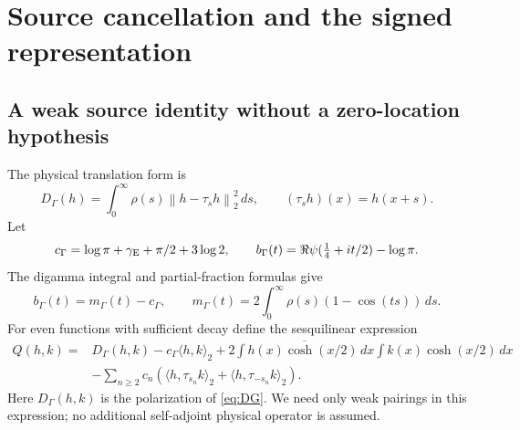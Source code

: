 \documentclass[11pt,a4paper]{article}
\numberwithin{equation}{section}
\theoremstyle{definition}\newtheorem{definition}[theorem]{Definition}
\theoremstyle{remark}\newtheorem{remark}[theorem]{Remark}
\newcommand{\ip}[2]{\langle #1,#2\rangle}
\newcommand{\norm}[1]{\left\|#1\right\|}
\begin{document}
\section{Source cancellation and the signed representation}\label{sec:sourceidentity}
\subsection{A weak source identity without a zero-location hypothesis}
The physical translation form is
\begin{equation}\label{eq:DG}
 D_\Gamma(h)=\int_0^\infty\rho(s)\norm{h-\tau_s h}_2^2\,ds,
 \qquad (\tau_s h)(x)=h(x+s).
\end{equation}
Let
\begin{equation}
 c_\Gamma=\log\pi+\gamma_{\rm E}+\pi/2+3\log2,
 \qquad b_\Gamma(t)=\Re\psi(\tfrac14+it/2)-\log\pi.
\end{equation}
The digamma integral and partial-fraction formulas \cite{nistgamma} give
\begin{equation}\label{eq:gammafourier}
 b_\Gamma(t)=m_\Gamma(t)-c_\Gamma,\qquad
 m_\Gamma(t)=2\int_0^\infty\rho(s)(1-\cos(ts))\,ds.
\end{equation}
For even functions with sufficient decay define the sesquilinear expression
\begin{align}\label{eq:Q}
 Q(h,k)={}&D_\Gamma(h,k)-c_\Gamma\ip hk_2
 +2\overline{\int h(x)\cosh(x/2)\,dx}\int k(x)\cosh(x/2)\,dx\nonumber\\
 &-\sum_{n\ge2}c_n\left(\ip h{\tau_{s_n}k}_2+\ip h{\tau_{-s_n}k}_2\right).
\end{align}
Here $D_\Gamma(h,k)$ is the polarization of \eqref{eq:DG}. We need only weak pairings in this expression; no additional self-adjoint physical operator is assumed.
\end{document}
